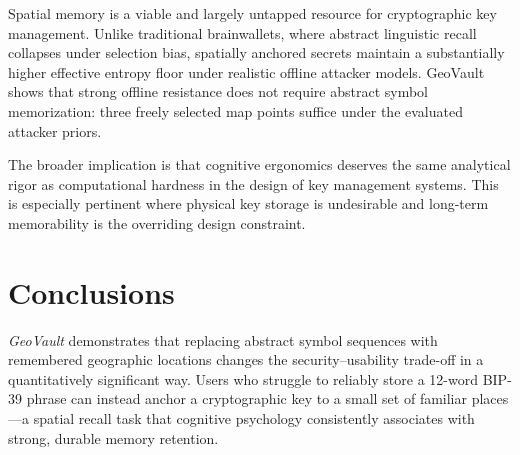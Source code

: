 \documentclass[mathematics,article,accept,pdftex,moreauthors]{Definitions/mdpi}
\begin{document}
{Spatial memory is a viable and largely untapped resource for cryptographic key management. Unlike traditional brainwallets, where abstract linguistic recall collapses under selection bias, spatially anchored secrets maintain a substantially higher effective entropy floor under realistic offline attacker models. GeoVault shows that strong offline resistance does not require abstract symbol memorization: three freely selected map points suffice under the evaluated attacker priors.}

{The broader implication is that cognitive ergonomics deserves the same analytical rigor as computational hardness in the design of key management systems. This is especially pertinent where physical key storage is undesirable and long-term memorability is the overriding design constraint.}

\section{Conclusions\label{sec7}}

{\textit{GeoVault} demonstrates that replacing abstract symbol sequences with remembered geographic locations changes the security--usability trade-off in a quantitatively significant way. Users who struggle to reliably store a 12-word BIP-39 phrase can instead anchor a cryptographic key to a small set of familiar places---a spatial recall task that cognitive psychology consistently associates with strong, durable memory retention.}
\end{document}
